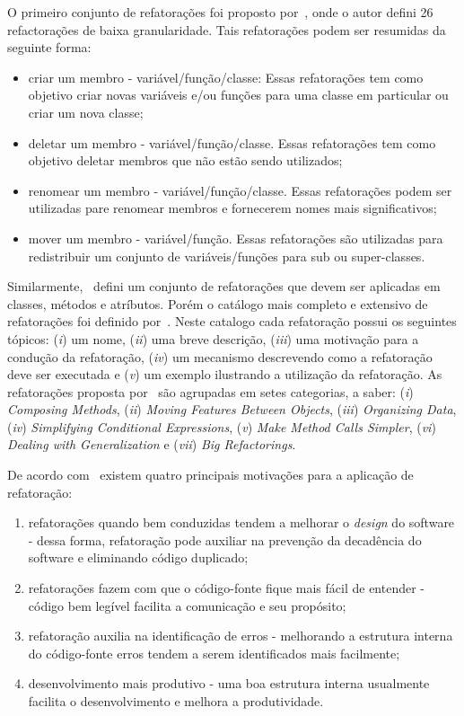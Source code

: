 O primeiro conjunto de refatorações foi proposto por~, onde o autor defini 26 refactorações de baixa granularidade. Tais refatorações podem ser resumidas da seguinte forma:

\begin{itemize}
	\item criar um membro  - variável/função/classe: Essas refatorações tem como objetivo criar novas variáveis e/ou funções para uma classe em particular ou criar um nova classe;
	\item deletar um membro - variável/função/classe. Essas refatorações tem como objetivo  deletar membros que não estão sendo utilizados;
	\item renomear um membro - variável/função/classe. Essas refatorações podem ser utilizadas pare renomear membros e fornecerem nomes mais significativos;
	\item mover um membro - variável/função. Essas refatorações são utilizadas para redistribuir um conjunto de variáveis/funções para sub ou super-classes.
\end{itemize}

Similarmente,~ defini um conjunto de refatorações que devem ser aplicadas em classes, métodos e atríbutos. Porém o catálogo mais completo e extensivo de refatorações foi definido por~. Neste catalogo cada refatoração possui os seguintes tópicos: (\textit{i}) um nome, (\textit{ii}) uma breve descrição, (\textit{iii}) uma motivação para a condução da refatoração, (\textit{iv}) um mecanismo descrevendo como a refatoração deve ser executada e (\textit{v}) um exemplo ilustrando a utilização da refatoração. As refatorações proposta por~ são agrupadas em setes categorias, a saber: (\textit{i}) \textit{Composing Methods}, (\textit{ii}) \textit{Moving Features Between Objects}, (\textit{iii}) \textit{Organizing Data}, (\textit{iv}) \textit{Simplifying Conditional Expressions}, (\textit{v}) \textit{Make Method Calls Simpler}, (\textit{vi}) \textit{Dealing with Generalization} e (\textit{vii}) \textit{Big Refactorings}.

De acordo com~ existem quatro principais motivações para a aplicação de refatoração:

\begin{enumerate}
	\item refatorações quando bem conduzidas tendem a melhorar o \textit{design} do software - dessa forma, refatoração pode auxiliar na prevenção da decadência do software e eliminando código duplicado;
	\item refatorações fazem com que o código-fonte fique mais fácil de entender - código bem legível facilita a comunicação e seu propósito;
	\item refatoração auxilia na identificação de erros - melhorando a estrutura interna do código-fonte erros tendem a serem identificados mais facilmente;
	\item desenvolvimento mais produtivo - uma boa estrutura interna usualmente facilita o desenvolvimento e melhora a produtividade.
\end{enumerate}

